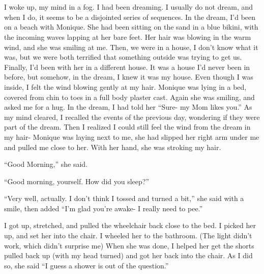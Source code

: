 \chapter{}
I woke up, my mind in a fog. I had been dreaming. I usually do not dream, and when I do, it
seems to be a disjointed series of sequences. In the dream, I'd been on a beach with Monique.
She had been sitting on the sand in a blue bikini, with the incoming waves lapping at her bare
feet. Her hair was blowing in the warm wind, and she was smiling at me. Then, we were in a
house, I don't know what it was, but we were both terrified that something outside was trying to
get us. Finally, I'd been with her in a different house. It was a house I'd never been in
before, but somehow, in the dream, I knew it was my house. Even though I was inside, I felt the
wind blowing gently at my hair. Monique was lying in a bed, covered from chin to toes in a full
body plaster cast. Again she was smiling, and asked me for a hug. In the dream, I had told her
``Sure- my Mom likes you.'' As my mind cleared, I recalled the events of the previous day,
wondering if they were part of the dream. Then I realized I could still feel the wind from the
dream in my hair- Monique was laying next to me, she had slipped her right arm under me and
pulled me close to her. With her hand, she was stroking my hair.

``Good Morning,'' she said. 

``Good morning, yourself. How did you sleep?''

``Very well, actually. I don't think I tossed and turned a bit,'' she said with a smile,
then added ``I'm glad you're awake- I really need to pee.''

I got up, stretched, and pulled the wheelchair back close to the bed. I picked her up, and
set her into the chair. I wheeled her to the bathroom. (The light didn't work, which didn't
surprise me) When she was done, I helped her get the shorts pulled back up (with my head turned)
and got her back into the chair. As I did so, she said ``I guess a shower is out of the
question.''


